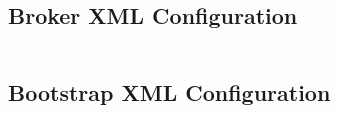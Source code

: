\subsection{Broker XML Configuration}\label{sec:broker_artemis}
\inputminted{xml}{../tests/messaging/artemis-server/broker.xml}

\subsection{Bootstrap XML Configuration}\label{sec:bootstrap_artemis}
\inputminted{xml}{../tests/messaging/artemis-server/bootstrap.xml}
